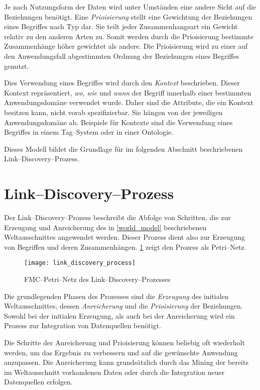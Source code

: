 Je nach Nutzungsform der Daten wird unter Umständen eine andere Sicht auf die Beziehungen benötigt. Eine \emph{Prioisierung} stellt eine Gewichtung der Beziehungen eines Begriffes nach Typ dar. Sie teilt jeder Zusammenhangsart ein Gewicht relativ zu den anderen Arten zu. Somit werden durch die Prioisierung bestimmte Zusammenhänge höher gewichtet als andere. Die Prioisierung wird zu einer auf den Anwendungsfall abgestimmten Ordnung der Beziehungen eines Begriffes genutzt.

Dies Verwendung eines Begriffes wird durch den \emph{Kontext} beschrieben. Dieser Kontext repräsentiert, \emph{wo}, \emph{wie} und \emph{wann} der Begriff innerhalb einer bestimmten Anwendungsdomäne verwendet wurde. Daher sind die Attribute, die ein Kontext besitzen kann, nicht vorab spezifizierbar. Sie hängen von der jeweiligen Anwendungsdomäne ab. Beispiele für Kontexte sind die Verwendung eines Begriffes in einem Tag--System oder in einer Ontologie.

Dieses Modell bildet die Grundlage für  im folgenden Abschnitt beschriebenen Link--Discovery--Prozess.

\section{Link--Discovery--Prozess}
\label{ld_process}

Der Link--Discovery--Prozess beschreibt die Abfolge von Schritten, die zur Erzeugung und Anreicherung des in \cref{world_model} beschriebenen Weltausschnittes angewendet werden. Dieser Prozess dient also zur Erzeugung von Begriffen und deren Zusammenhängen. \cref{fig:link_discovery_process} zeigt den Prozess als Petri--Netz.

\begin{figure}
\centering
\texttt{[image: link\_discovery\_process]}
\caption{FMC--Petri--Netz des Link--Discovery--Prozesses}
\label{fig:link_discovery_process}
\end{figure}

Die grundlegenden Phasen des Prozesses sind die \emph{Erzeugung} des initialen Weltausschnittes, dessen \emph{Anreicherung} und die \emph{Prioisierung} der Beziehungen. Sowohl bei der initialen Erzeugung, als auch bei der Anreicherung wird ein Prozess zur Integration von Datenquellen benötigt.

Die Schritte der Anreicherung und Prioisierung können beliebig oft wiederholt werden, um das Ergebnis zu verbessern und auf die gewünschte Anwendung anzupassen. Die Anreicherung kann grundsätzlich durch das Mining der bereits im Weltausschnitt vorhandenen Daten oder durch die Integration neuer Datenquellen erfolgen.

